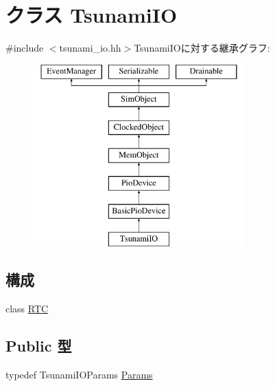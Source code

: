 \hypertarget{classTsunamiIO}{
\section{クラス TsunamiIO}
\label{classTsunamiIO}
}


{\ttfamily \#include $<$tsunami\_\-io.hh$>$}TsunamiIOに対する継承グラフ:\begin{figure}[H]
\begin{center}
\leavevmode
\includegraphics[height=7cm]{classTsunamiIO}
\end{center}
\end{figure}
\subsection*{構成}
\begin{DoxyCompactItemize}
\item 
class \hyperlink{classTsunamiIO_1_1RTC}{RTC}
\end{DoxyCompactItemize}
\subsection*{Public 型}
\begin{DoxyCompactItemize}
\item 
typedef TsunamiIOParams \hyperlink{classTsunamiIO_a46efefdf21511fe3655f4589444a8479}{Params}
\end{DoxyCompactItemize}
